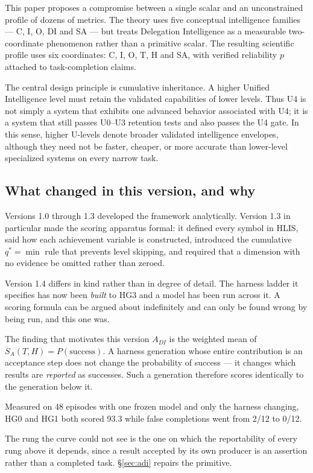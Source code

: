 \documentclass[11pt]{article}
\theoremstyle{definition}
\newcommand{\SA}{\ensuremath{S_A(T,H)}}
\begin{document}
This paper proposes a compromise between a single scalar and an unconstrained profile of dozens of metrics. The theory uses five conceptual intelligence families --- C, I, O, DI and SA --- but treats Delegation Intelligence as a measurable two-coordinate phenomenon rather than a primitive scalar. The resulting scientific profile uses six coordinates: C, I, O, T, H and SA, with verified reliability $p$ attached to task-completion claims.

The central design principle is cumulative inheritance. A higher Unified Intelligence level must retain the validated capabilities of lower levels. Thus U4 is not simply a system that exhibits one advanced behavior associated with U4; it is a system that still passes U0--U3 retention tests and also passes the U4 gate. In this sense, higher U-levels denote broader validated intelligence envelopes, although they need not be faster, cheaper, or more accurate than lower-level specialized systems on every narrow task.

\subsection{What changed in this version, and why}

Versions 1.0 through 1.3 developed the framework analytically. Version 1.3 in particular made the scoring apparatus formal: it defined every symbol in HLIS, said how each achievement variable is constructed, introduced the cumulative $q^{*}=\min$ rule that prevents level skipping, and required that a dimension with no evidence be omitted rather than zeroed.

Version 1.4 differs in kind rather than in degree of detail. The harness ladder it specifies has now been \emph{built} to HG3 and a model has been run across it. A scoring formula can be argued about indefinitely and can only be found wrong by being run, and this one was.

\begin{cautionbox}{The finding that motivates this version}
$A_{DI}$ is the weighted mean of $\SA{} = P(\text{success})$. A harness generation whose entire contribution is an acceptance step does not change the probability of success --- it changes which results are \emph{reported} as successes. Such a generation therefore scores identically to the generation below it.

Measured on 48 episodes with one frozen model and only the harness changing, HG0 and HG1 both scored 93.3 while false completions went from 2/12 to 0/12.

The rung the curve could not see is the one on which the reportability of every rung above it depends, since a result accepted by its own producer is an assertion rather than a completed task. \S\ref{sec:adi} repairs the primitive.
\end{cautionbox}
\end{document}
